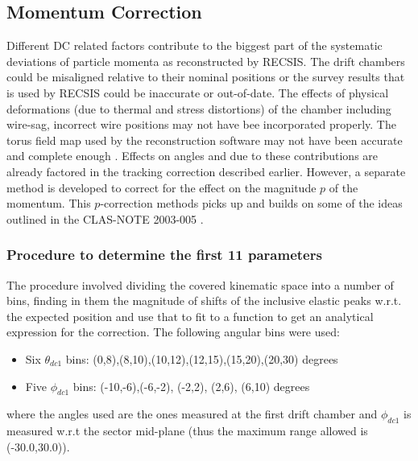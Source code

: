 

\subsection{Momentum Correction}
Different DC related factors contribute to the biggest part of the systematic deviations of particle momenta as reconstructed by RECSIS. The drift chambers could be misaligned relative to their nominal positions or the survey results that is used by RECSIS could be inaccurate or out-of-date. The effects of physical deformations (due to thermal and stress distortions) of the chamber including wire-sag, incorrect wire positions may not have bee incorporated properly. The torus field map used by the reconstruction software may not have been accurate and complete enough \cite{e6momcor_cn}. Effects on angles \th and \ph due to these contributions are already factored in the tracking correction described earlier. However, a separate method is developed to correct for the effect on the magnitude $p$ of the momentum. This $p$-correction methods picks up and builds on some of the ideas outlined in the CLAS-NOTE 2003-005 \cite{e6momcor_cn}.

\subsubsection{Procedure to determine the first 11 parameters}
\label{pCorFit1}
The procedure involved dividing the covered kinematic space into a number of bins, finding in them the magnitude of shifts of the inclusive 
elastic peaks w.r.t. the expected position and use that to fit to a function to get an analytical expression for the correction. The 
following angular bins were used:
\begin{itemize}
\item Six $\theta_{dc1}$ bins: (0,8),(8,10),(10,12),(12,15),(15,20),(20,30) degrees
\item Five $\phi_{dc1}$ bins: (-10,-6),(-6,-2), (-2,2), (2,6), (6,10) degrees 
\end{itemize}
where the angles used are the ones measured at the first drift chamber and $\phi_{dc1}$ is measured w.r.t the sector mid-plane (thus the 
maximum range allowed is (-30.0,30.0)).
  
